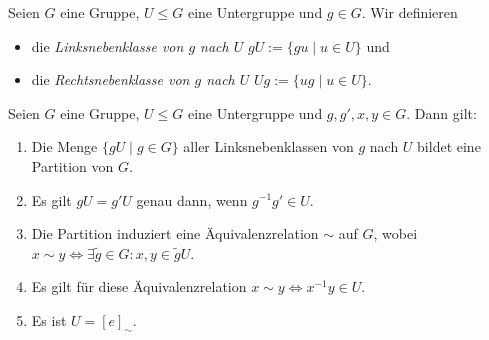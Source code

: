 
\begin{definition}
    Seien $G$ eine Gruppe, $U \le G$ eine Untergruppe und $g \in G$. Wir definieren 
    \begin{itemize}[topsep=0cm, label={--}]
        \item die \emph{Linksnebenklasse von $g$ nach $U$} $gU := \{gu \mid u \in U\}$ und
        \item die \emph{Rechtsnebenklasse von $g$ nach $U$} $Ug := \{ug \mid u \in U\}$.
    \end{itemize}
\end{definition}

\begin{lemma}\label{lemma:euqivrel_linksnebenklassen}
    Seien $G$ eine Gruppe, $U \le G$ eine Untergruppe und $g, g', x, y \in G$. Dann gilt:
    \begin{enumerate}
        \item Die Menge $\{gU \mid g \in G\}$ aller Linksnebenklassen von $g$ nach $U$ bildet eine Partition von $G$.
        \item Es gilt $gU = g'U$ genau dann, wenn $g^{-1}g' \in U$.
        \item Die Partition induziert eine Äquivalenzrelation $\sim$ auf $G$, wobei $x \sim y \Leftrightarrow \exists \tilde{g} \in G: x,y \in \tilde{g}U$.
        \item Es gilt für diese Äquivalenzrelation $x \sim y \Leftrightarrow x^{-1}y \in U$.\label{item:lemma:euqivrel_linksnebenklassen_4}
        \item Es ist $U = [e]_{\sim}$.
    \end{enumerate}
    
\end{lemma}
